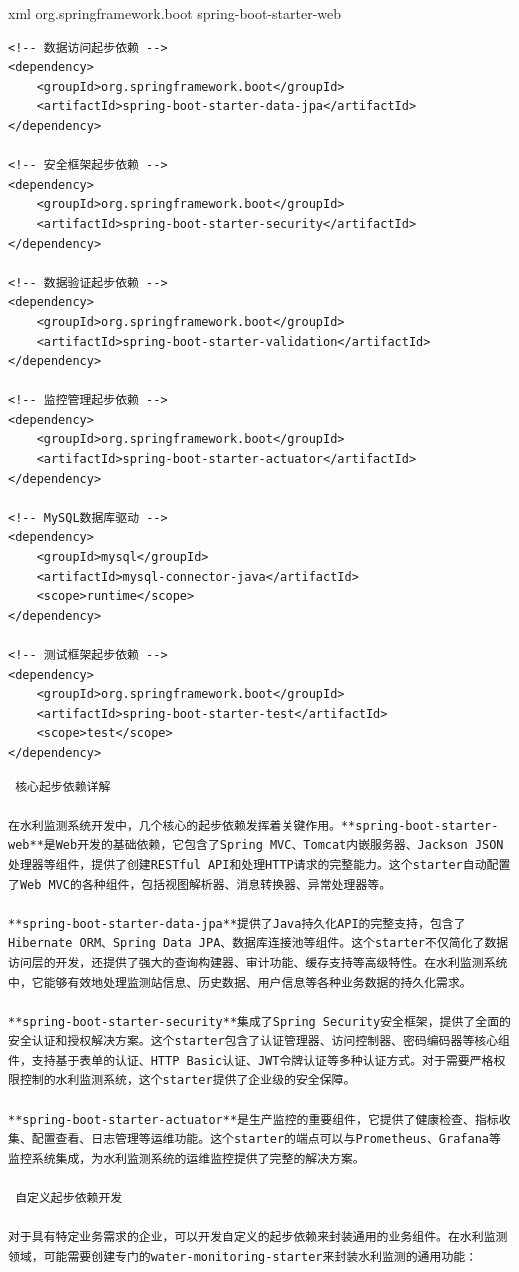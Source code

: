 xml org.springframework.boot spring-boot-starter-web

\begin{verbatim}
<!-- 数据访问起步依赖 -->
<dependency>
    <groupId>org.springframework.boot</groupId>
    <artifactId>spring-boot-starter-data-jpa</artifactId>
</dependency>

<!-- 安全框架起步依赖 -->
<dependency>
    <groupId>org.springframework.boot</groupId>
    <artifactId>spring-boot-starter-security</artifactId>
</dependency>

<!-- 数据验证起步依赖 -->
<dependency>
    <groupId>org.springframework.boot</groupId>
    <artifactId>spring-boot-starter-validation</artifactId>
</dependency>

<!-- 监控管理起步依赖 -->
<dependency>
    <groupId>org.springframework.boot</groupId>
    <artifactId>spring-boot-starter-actuator</artifactId>
</dependency>

<!-- MySQL数据库驱动 -->
<dependency>
    <groupId>mysql</groupId>
    <artifactId>mysql-connector-java</artifactId>
    <scope>runtime</scope>
</dependency>

<!-- 测试框架起步依赖 -->
<dependency>
    <groupId>org.springframework.boot</groupId>
    <artifactId>spring-boot-starter-test</artifactId>
    <scope>test</scope>
</dependency>
\end{verbatim}

\begin{lstlisting}
 核心起步依赖详解

在水利监测系统开发中，几个核心的起步依赖发挥着关键作用。**spring-boot-starter-web**是Web开发的基础依赖，它包含了Spring MVC、Tomcat内嵌服务器、Jackson JSON处理器等组件，提供了创建RESTful API和处理HTTP请求的完整能力。这个starter自动配置了Web MVC的各种组件，包括视图解析器、消息转换器、异常处理器等。

**spring-boot-starter-data-jpa**提供了Java持久化API的完整支持，包含了Hibernate ORM、Spring Data JPA、数据库连接池等组件。这个starter不仅简化了数据访问层的开发，还提供了强大的查询构建器、审计功能、缓存支持等高级特性。在水利监测系统中，它能够有效地处理监测站信息、历史数据、用户信息等各种业务数据的持久化需求。

**spring-boot-starter-security**集成了Spring Security安全框架，提供了全面的安全认证和授权解决方案。这个starter包含了认证管理器、访问控制器、密码编码器等核心组件，支持基于表单的认证、HTTP Basic认证、JWT令牌认证等多种认证方式。对于需要严格权限控制的水利监测系统，这个starter提供了企业级的安全保障。

**spring-boot-starter-actuator**是生产监控的重要组件，它提供了健康检查、指标收集、配置查看、日志管理等运维功能。这个starter的端点可以与Prometheus、Grafana等监控系统集成，为水利监测系统的运维监控提供了完整的解决方案。

 自定义起步依赖开发

对于具有特定业务需求的企业，可以开发自定义的起步依赖来封装通用的业务组件。在水利监测领域，可能需要创建专门的water-monitoring-starter来封装水利监测的通用功能：
\end{lstlisting}

